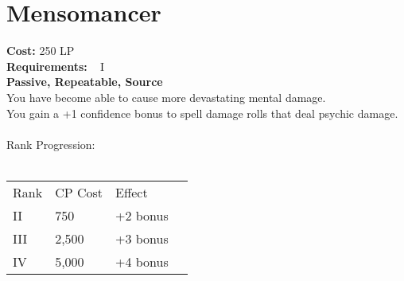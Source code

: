 \section{Mensomancer}\label{perk:mensomancer}
\textbf{Cost:} 250 LP\\
\textbf{Requirements:} ~ I\\
\textbf{Passive, Repeatable, Source}\\
You have become able to cause more devastating mental damage.\\
You gain a +1 confidence bonus to spell damage rolls that deal psychic damage.\\
\\
Rank Progression:\\
\\
\begin{tabular}{l | l | l | l}
    Rank & CP Cost &  Effect\\
    II & 750 & +2 bonus\\
    III & 2,500 & +3 bonus\\
    IV & 5,000 & +4 bonus\\
\end{tabular}